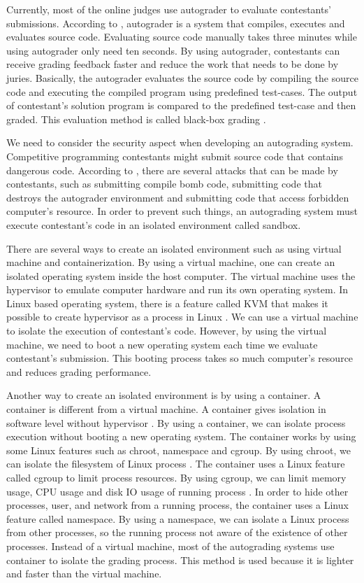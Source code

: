 \documentclass[conference,a4paper]{IEEEtran}
\begin{document}
Currently, most of the online judges use autograder to evaluate contestants' submissions. According to \cite{danutamalms}, autograder is a system that compiles, executes and evaluates source code. Evaluating source code manually takes three minutes while using autograder only need ten seconds. By using autograder, contestants can receive grading feedback faster and reduce the work that needs to be done by juries. Basically, the autograder evaluates the source code by compiling the source code and executing the compiled program using predefined test-cases. The output of contestant's solution program is compared to the predefined test-case and then graded. This evaluation method is called black-box grading \cite{jordanioi}.

We need to consider the security aspect when developing an autograding system. Competitive programming contestants might submit source code that contains dangerous code. According to \cite{wasikojsurvey}, there are several attacks that can be made by contestants, such as submitting compile bomb code, submitting code that destroys the autograder environment and submitting code that access forbidden computer's resource. In order to prevent such things, an autograding system must execute contestant's code in an isolated environment called sandbox.

There are several ways to create an isolated environment such as using virtual machine and containerization. By using a virtual machine, one can create an isolated operating system inside the host computer. The virtual machine uses the hypervisor to emulate computer hardware and run its own operating system. In Linux based operating system, there is a feature called KVM that makes it possible to create hypervisor as a process in Linux \cite{wfeltervmcontainer}. We can use a virtual machine to isolate the execution of contestant's code. However, by using the virtual machine, we need to boot a new operating system each time we evaluate contestant's submission. This booting process takes so much computer's resource and reduces grading performance.

Another way to create an isolated environment is by using a container. A container is different from a virtual machine. A container gives isolation in software level without hypervisor \cite{merkeldocker}. By using a container, we can isolate process execution without booting a new operating system. The container works by using some Linux features such as chroot, namespace and cgroup. By using chroot, we can isolate the filesystem of Linux process \cite{lessardchroot}. The container uses a Linux feature called cgroup to limit process resources. By using cgroup, we can limit memory usage, CPU usage and disk IO usage of running process \cite{wfeltervmcontainer}. In order to hide other processes, user, and network from a running process, the container uses a Linux feature called namespace. By using a namespace, we can isolate a Linux process from other processes, so the running process not aware of the existence of other processes. Instead of a virtual machine, most of the autograding systems use container to isolate the grading process. This method is used because it is lighter and faster than the virtual machine. 
\end{document}
